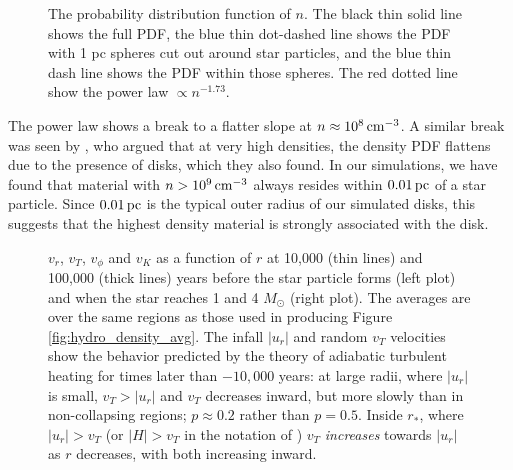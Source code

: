 \documentclass[../dissertation.tex]{subfiles}
\begin{document}
\begin{figure}[htb] %
\caption[Hydro Velocity vs. Density]{\label{fig:hydro_PDF_quad1}The probability distribution function of $n$. The black thin solid line
shows the full PDF, the blue thin dot-dashed line shows the PDF with 1 pc spheres 
cut out around star particles, and the blue thin dash line shows 
the PDF within those spheres. 
The red dotted line show the power law $\propto n^{-1.73}$.  }
\end{figure}

The power law shows a break to a flatter slope at $n\approx 10^8\,\rm cm^{-3}$. A similar 
break was seen by 
\citet{2011ApJ...727L..20K}, who argued that at very high densities, the density PDF 
flattens due to the presence of disks, which they also found. 
In our simulations,  we have found that 
material with $n>10^9\,{\rm cm}^{-3}$ always resides within 
$0.01 \,\rm pc$ of a star particle. Since $0.01\,\rm pc$ is the typical outer 
radius of our simulated disks, this suggests that the highest density material is strongly associated with the disk.

% 
\begin{figure*}[htb]%
\caption[Hydro Sink Averaged run of Velocity]{$v_r$, $v_T$, $v_{\phi}$ and $v_K$ as a function of $r$ at 10,000 
(thin lines) and 100,000 (thick lines) years before the star particle forms 
(left plot) and when the star reaches 1 and 4 $M_{\odot}$ (right plot).  
The averages are over the same regions as those used in producing 
Figure \ref{fig:hydro_density_avg}. The infall $|u_r|$ and random $v_T$ velocities show 
the behavior predicted by the theory of adiabatic turbulent heating for times 
later than $-10,000$ years: 
at large radii, where $|u_r|$ is small, $v_T>|u_r|$ and $v_T$ decreases 
inward, but more slowly than in non-collapsing regions; $p\approx0.2$ 
rather than $p=0.5$. Inside $r_*$, 
where $|u_r|>v_T$ (or $|H|>v_T$ in the notation of 
\citet{2012ApJ...750L..31R}) $v_T$ {\em increases} towards $|u_r|$ 
as $r$ decreases, with both increasing inward. \label{fig:hydro_velocity_avg}}
\end{figure*}
%
\end{document}
